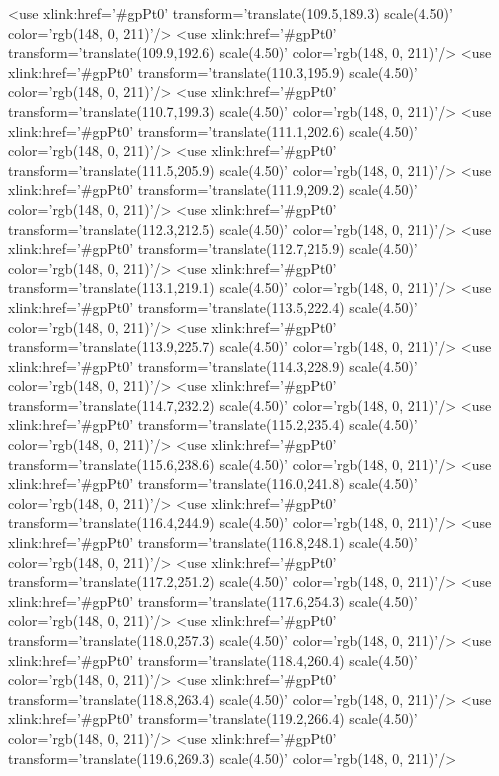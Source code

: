 	<use xlink:href='#gpPt0' transform='translate(109.5,189.3) scale(4.50)' color='rgb(148,   0, 211)'/>
	<use xlink:href='#gpPt0' transform='translate(109.9,192.6) scale(4.50)' color='rgb(148,   0, 211)'/>
	<use xlink:href='#gpPt0' transform='translate(110.3,195.9) scale(4.50)' color='rgb(148,   0, 211)'/>
	<use xlink:href='#gpPt0' transform='translate(110.7,199.3) scale(4.50)' color='rgb(148,   0, 211)'/>
	<use xlink:href='#gpPt0' transform='translate(111.1,202.6) scale(4.50)' color='rgb(148,   0, 211)'/>
	<use xlink:href='#gpPt0' transform='translate(111.5,205.9) scale(4.50)' color='rgb(148,   0, 211)'/>
	<use xlink:href='#gpPt0' transform='translate(111.9,209.2) scale(4.50)' color='rgb(148,   0, 211)'/>
	<use xlink:href='#gpPt0' transform='translate(112.3,212.5) scale(4.50)' color='rgb(148,   0, 211)'/>
	<use xlink:href='#gpPt0' transform='translate(112.7,215.9) scale(4.50)' color='rgb(148,   0, 211)'/>
	<use xlink:href='#gpPt0' transform='translate(113.1,219.1) scale(4.50)' color='rgb(148,   0, 211)'/>
	<use xlink:href='#gpPt0' transform='translate(113.5,222.4) scale(4.50)' color='rgb(148,   0, 211)'/>
	<use xlink:href='#gpPt0' transform='translate(113.9,225.7) scale(4.50)' color='rgb(148,   0, 211)'/>
	<use xlink:href='#gpPt0' transform='translate(114.3,228.9) scale(4.50)' color='rgb(148,   0, 211)'/>
	<use xlink:href='#gpPt0' transform='translate(114.7,232.2) scale(4.50)' color='rgb(148,   0, 211)'/>
	<use xlink:href='#gpPt0' transform='translate(115.2,235.4) scale(4.50)' color='rgb(148,   0, 211)'/>
	<use xlink:href='#gpPt0' transform='translate(115.6,238.6) scale(4.50)' color='rgb(148,   0, 211)'/>
	<use xlink:href='#gpPt0' transform='translate(116.0,241.8) scale(4.50)' color='rgb(148,   0, 211)'/>
	<use xlink:href='#gpPt0' transform='translate(116.4,244.9) scale(4.50)' color='rgb(148,   0, 211)'/>
	<use xlink:href='#gpPt0' transform='translate(116.8,248.1) scale(4.50)' color='rgb(148,   0, 211)'/>
	<use xlink:href='#gpPt0' transform='translate(117.2,251.2) scale(4.50)' color='rgb(148,   0, 211)'/>
	<use xlink:href='#gpPt0' transform='translate(117.6,254.3) scale(4.50)' color='rgb(148,   0, 211)'/>
	<use xlink:href='#gpPt0' transform='translate(118.0,257.3) scale(4.50)' color='rgb(148,   0, 211)'/>
	<use xlink:href='#gpPt0' transform='translate(118.4,260.4) scale(4.50)' color='rgb(148,   0, 211)'/>
	<use xlink:href='#gpPt0' transform='translate(118.8,263.4) scale(4.50)' color='rgb(148,   0, 211)'/>
	<use xlink:href='#gpPt0' transform='translate(119.2,266.4) scale(4.50)' color='rgb(148,   0, 211)'/>
	<use xlink:href='#gpPt0' transform='translate(119.6,269.3) scale(4.50)' color='rgb(148,   0, 211)'/>
